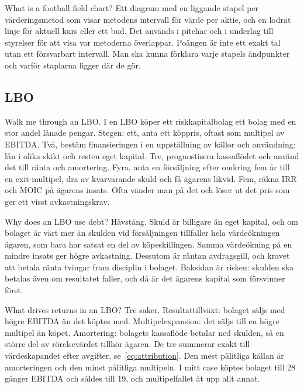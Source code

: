 \begin{fraga}{What is a football field chart?}
Ett diagram med en liggande stapel per värderingsmetod som visar metodens intervall för värde
per aktie, och en lodrät linje för aktuell kurs eller ett bud. Det används i pitchar och i
underlag till styrelser för att visa var metoderna överlappar. Poängen är inte ett exakt tal
utan ett försvarbart intervall. Man ska kunna förklara varje stapels ändpunkter och varför
staplarna ligger där de gör.
\end{fraga}

\subsection{LBO}

\begin{fraga}{Walk me through an LBO.}
I en LBO köper ett riskkapitalbolag ett bolag med en stor andel lånade pengar. Stegen: ett,
anta ett köppris, oftast som multipel av EBITDA. Två, bestäm finansieringen i en uppställning
av källor och användning: lån i olika skikt och resten eget kapital. Tre, prognostisera
kassaflödet och använd det till ränta och amortering. Fyra, anta en försäljning efter omkring
fem år till en exit-multipel, dra av kvarvarande skuld och få ägarens likvid. Fem, räkna IRR
och MOIC på ägarens insats. Ofta vänder man på det och löser ut det pris som ger ett visst
avkastningskrav.
\end{fraga}

\begin{fraga}{Why does an LBO use debt?}
Hävstång. Skuld är billigare än eget kapital, och om bolaget är värt mer än skulden vid
försäljningen tillfaller hela värdeökningen ägaren, som bara har satsat en del av köpeskillingen.
Samma värdeökning på en mindre insats ger högre avkastning. Dessutom är räntan avdragsgill, och
kravet att betala ränta tvingar fram disciplin i bolaget. Baksidan är risken: skulden ska
betalas även om resultatet faller, och då är det ägarens kapital som försvinner först.
\end{fraga}

\begin{fraga}{What drives returns in an LBO?}
Tre saker. Resultattillväxt: bolaget säljs med högre EBITDA än det köptes med. Multipelexpansion:
det säljs till en högre multipel än köpet. Amortering: bolagets kassaflöde betalar ned skulden,
så en större del av rörelsevärdet tillhör ägaren. De tre summerar exakt till värdeskapandet
efter avgifter, se~\eqref{eq:attribution}. Den mest pålitliga källan är amorteringen och den
minst pålitliga multipeln. I mitt case köptes bolaget till 28 gånger EBITDA och såldes till 19,
och multipelfallet åt upp allt annat.
\end{fraga}

